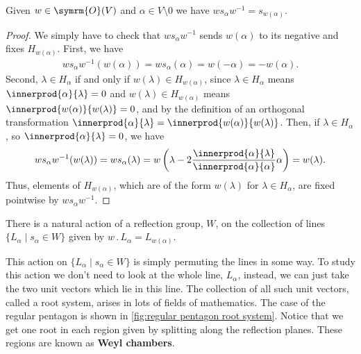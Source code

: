 \documentclass[fleqn, a4paper, openany]{memoir}
\newcommand{\define}[1]{\textbf{#1}}
\newcommand{\orthogonal}{\symrm{O}}
\newcommand{\action}{\mathbin{.}}
\begin{document}
    \begin{lma}{}{}
        Given \(w \in \orthogonal(V)\) and \(\alpha \in V \setminus 0\) we have \(ws_\alpha w^{-1} = s_{w(\alpha)}\).
        \begin{proof}
            We simply have to check that \(ws_\alpha w^{-1}\) sends \(w(\alpha)\) to its negative and fixes \(H_{w(\alpha)}\).
            First, we have
            \begin{align}
                ws_{\alpha}w^{-1}(w(\alpha)) = ws_\alpha(\alpha) = w(-\alpha) = -w(\alpha).
            \end{align}
            Second, \(\lambda \in H_\alpha\) if and only if \(w(\lambda) \in H_{w(\alpha)}\), since \(\lambda \in H_\alpha\) means \(\innerprod{\alpha}{\lambda} = 0\) and \(w(\lambda) \in H_{w(\alpha)}\) means \(\innerprod{w(\alpha)}{w(\lambda)} = 0\), and by the definition of an orthogonal transformation \(\innerprod{\alpha}{\lambda} = \innerprod{w(\alpha)}{w(\lambda)}\).
            Then, if \(\lambda \in H_\alpha\), so \(\innerprod{\alpha}{\lambda} = 0\), we have
            \begin{equation}
                ws_\alpha w^{-1}(w(\lambda)) = ws_\alpha(\lambda) = w\left( \lambda - 2\frac{\innerprod{\alpha}{\lambda}}{\innerprod{\alpha}{\alpha}}\alpha \right) = w(\lambda).
            \end{equation}
            Thus, elements of \(H_{w(\alpha)}\), which are of the form \(w(\lambda)\) for \(\lambda \in H_\alpha\), are fixed pointwise by \(ws_\alpha w^{-1}\).
        \end{proof}
    \end{lma}
    
    \begin{crl}{}{}
        There is a natural action of a reflection group, \(W\), on the collection of lines \(\{L_\alpha \mid s_\alpha \in W\}\) given by \(w \action L_\alpha = L_{w(\alpha)}\).
    \end{crl}
    
    This action on \(\{L_\alpha \mid s_\alpha \in W\}\) is simply permuting the lines in some way.
    To study this action we don't need to look at the whole line, \(L_\alpha\), instead, we can just take the two unit vectors which lie in this line.
    The collection of all such unit vectors, called a root system, arises in lots of fields of mathematics.
    The case of the regular pentagon is shown in \cref{fig:regular pentagon root system}.
    Notice that we get one root in each region given by splitting along the reflection planes.
    These regions are known as \define{Weyl chambers}.
    
\end{document}
